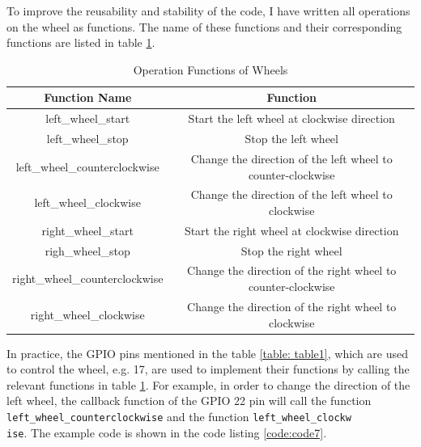 \documentclass[12pt]{report}
\newcommand{\code}[1]{\colorbox{light-gray}{\texttt{#1}}}
\begin{document}
To improve the reusability and stability of the code, I have written all operations on the wheel as functions. The name of these functions and their corresponding functions are listed in table \ref{table: table2}. \par
\begin{table}[H]
\centering
 \caption{Operation Functions of Wheels}
 \label{table: table2}
 \begin{tabular}{|c| c |} 
 \hline
 Function Name & Function  \\ [0.5ex] 
 \hline
 left\_wheel\_start & Start the left wheel at clockwise direction  \\ 
 \hline
 left\_wheel\_stop & Stop the left wheel \\
 \hline
 left\_wheel\_counterclockwise & Change the direction of the left wheel to counter-clockwise \\
 \hline
 left\_wheel\_clockwise & Change the direction of the left wheel to clockwise  \\
 \hline
  right\_wheel\_start & Start the right wheel at clockwise direction \\
 \hline
  righ\_wheel\_stop & Stop the right wheel  \\
 \hline
 right\_wheel\_counterclockwise & Change the direction of the right wheel to counter-clockwise  \\
 \hline
 right\_wheel\_clockwise & Change the direction of the right wheel to clockwise \\ 
 \hline
 \end{tabular}
\end{table}\vspace{-2em}
In practice, the GPIO pins mentioned in the table \ref{table: table1}, which are used to control the wheel, e.g. 17, are used to implement their functions by calling the relevant functions in table \ref{table: table2}. For example, in order to change the direction of the left wheel, the callback function of the GPIO 22 pin will call the function \code{left\_wheel\_counterclockwise} and the function \code{left\_wheel\_clockw}\\\code{ise}. The example code is shown in the code listing \ref{code:code7}.\par
\end{document}
